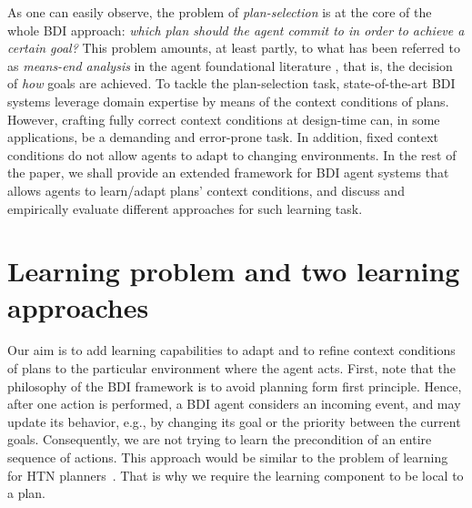 \documentclass{article}
\begin{document}
As one can easily observe, the problem of \textit{plan-selection} is at the core
of the whole BDI approach:
\emph{which plan should the agent commit to in order to achieve a certain goal?}
This problem amounts, at least partly, to what has been referred to as
\emph{means-end analysis} in the agent foundational literature
\cite{Pollack92-IRMA,Bratman88}, that is, the decision of \textit{how} goals are
achieved.
To tackle the plan-selection task, state-of-the-art BDI systems leverage domain
expertise by means of the context conditions of plans. However, crafting fully
correct context conditions at design-time can, in some applications, be a
demanding and error-prone task. In addition, fixed context conditions do not
allow agents to adapt to changing environments.
In the rest of the paper, we shall provide an extended framework for BDI agent
systems that allows agents to learn/adapt plans' context conditions, and discuss
and empirically evaluate different approaches for such learning task.


\section{Learning problem and two learning approaches}

Our aim is to add learning capabilities to adapt and to refine context
conditions of plans to the particular environment where the agent
acts. 
%
First, note that the philosophy of the BDI framework is to avoid
planning form first principle. Hence, after one action is performed, a
BDI agent considers an incoming event, and may update its behavior,
e.g., by changing its goal or the priority between the current
goals. Consequently, we are not trying to learn the precondition of an
entire sequence of actions. This approach would be similar to the
problem of learning for HTN
planners~\cite{Zhuo09:Learning,Ilghami05:Learning,Hogg08:htnmaker}.
That is why we require the learning component to be local to a plan.
\end{document}

